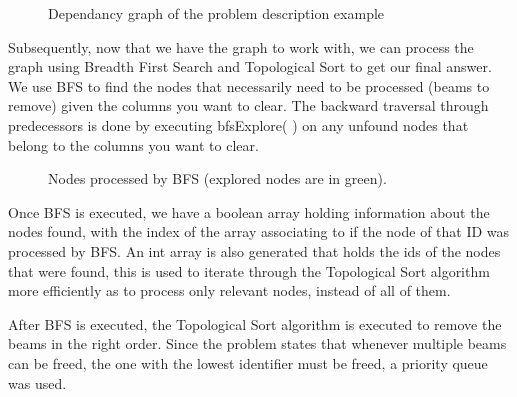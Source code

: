 \documentclass[runningheads]{llncs}
\begin{document}
\begin{figure}[h]
\centering
{}
\caption{Dependancy graph of the problem description example}
\end{figure}

\newpage
Subsequently, now that we have the graph to work with, we can process the graph using Breadth First Search and Topological Sort to get our final answer. We use BFS to find the nodes that necessarily need to be processed (beams to remove) given the columns you want to clear. The backward traversal through predecessors is done by executing bfsExplore( ) on any unfound nodes that belong to the columns you want to clear.

\begin{figure}[h]
\centering
{}
\caption{Nodes processed by BFS (explored nodes are in green).}
\end{figure}

Once BFS is executed, we have a boolean array holding information about the nodes found, with the index of the array associating to if the node of that ID was processed by BFS. An int array is also generated that holds the ids of the nodes that were found, this is used to iterate through the Topological Sort algorithm more efficiently as to process only relevant nodes, instead of all of them.

After BFS is executed, the Topological Sort algorithm is executed to remove the beams in the right order. Since the problem states that whenever multiple beams can be freed, the one with the lowest identifier must be freed, a priority queue was used.
\end{document}
